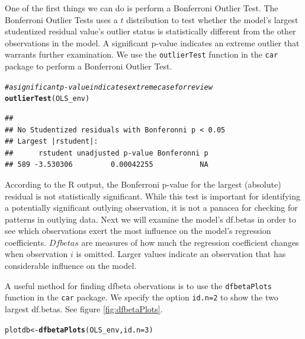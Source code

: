 \documentclass[11pt,openany]{book}\usepackage[]{graphicx}\usepackage[]{color}
\makeatletter
\newcommand{\hlnum}[1]{\textcolor[rgb]{0.686,0.059,0.569}{#1}}%
\newcommand{\hlcom}[1]{\textcolor[rgb]{0.678,0.584,0.686}{\textit{#1}}}%
\newcommand{\hlstd}[1]{\textcolor[rgb]{0.345,0.345,0.345}{#1}}%
\newcommand{\hlkwb}[1]{\textcolor[rgb]{0.69,0.353,0.396}{#1}}%
\newcommand{\hlkwc}[1]{\textcolor[rgb]{0.333,0.667,0.333}{#1}}%
\newcommand{\hlkwd}[1]{\textcolor[rgb]{0.737,0.353,0.396}{\textbf{#1}}}%
\newenvironment{kframe}{%
 \def\at@end@of@kframe{}%
 \ifinner\ifhmode%
  \def\at@end@of@kframe{\end{minipage}}%
  \begin{minipage}{\columnwidth}%
 \fi\fi%
 \def\FrameCommand##1{\hskip\@totalleftmargin \hskip-\fboxsep
 \colorbox{shadecolor}{##1}\hskip-\fboxsep
     \hskip-\linewidth \hskip-\@totalleftmargin \hskip\columnwidth}%
 \MakeFramed {\advance\hsize-\width
   \@totalleftmargin\z@ \linewidth\hsize
   \@setminipage}}%
 {\par\unskip\endMakeFramed%
 \at@end@of@kframe}
\newenvironment{knitrout}{}{} %
\renewenvironment{knitrout}{\begin{singlespace}}{\end{singlespace}} %
\makeatother
\begin{document}
One of the first things we can do is perform a Bonferroni Outlier Test. The Bonferroni Outlier Tests uses a $t$ distribution to test whether the model's largest studentized residual value's outlier status is statistically different from the other observations in the model.  A significant p-value indicates an extreme outlier that warrants further examination.  We use the \texttt{outlierTest} function in the \texttt{car} package to perform a Bonferroni Outlier Test.

\begin{knitrout}
\color{fgcolor}\begin{kframe}
\begin{alltt}
\hlcom{# a significant p-value indicates extreme case for review}
\hlkwd{outlierTest}\hlstd{(OLS_env)}
\end{alltt}
\begin{verbatim}
## 
## No Studentized residuals with Bonferonni p < 0.05
## Largest |rstudent|:
##      rstudent unadjusted p-value Bonferonni p
## 589 -3.530306         0.00042255           NA
\end{verbatim}
\end{kframe}
\end{knitrout}

According to the R output, the Bonferroni p-value for the largest (absolute) residual is not statistically significant.  While this test is important for identifying a potentially significant outlying  observation, it is not a panacea for checking for patterns in outlying data.  Next we will examine the model's df.betas in order to see which observations exert the most influence on the model's regression coefficients. $Dfbetas$ are measures of how much the regression coefficient changes when observation $i$ is omitted.  Larger values indicate an observation that has considerable influence on the model.   

A useful method for finding dfbeta obervations is to use the \texttt{dfbetaPlots} function in the \texttt{car} package.  We specify the option \texttt{id.n=2} to show the two largest df.betas.  See figure \ref{fig:dfbetaPlots}.

\begin{knitrout}
\color{fgcolor}\begin{kframe}
\begin{alltt}
\hlstd{plotdb} \hlkwb{<-} \hlkwd{dfbetaPlots}\hlstd{(OLS_env,} \hlkwc{id.n} \hlstd{=} \hlnum{3}\hlstd{)}
\end{alltt}
\end{kframe}
\end{knitrout}
\end{document}
